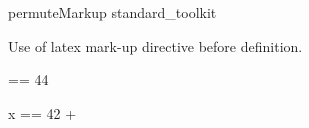 \begin{zsection}
\SECTION permuteMarkup \parents standard\_toolkit
\end{zsection}

Use of latex mark-up directive before definition.

\begin{axdef}
\mynum == 44
\end{axdef}

\begin{axdef}
x == 42 + \mynum
\end{axdef}


